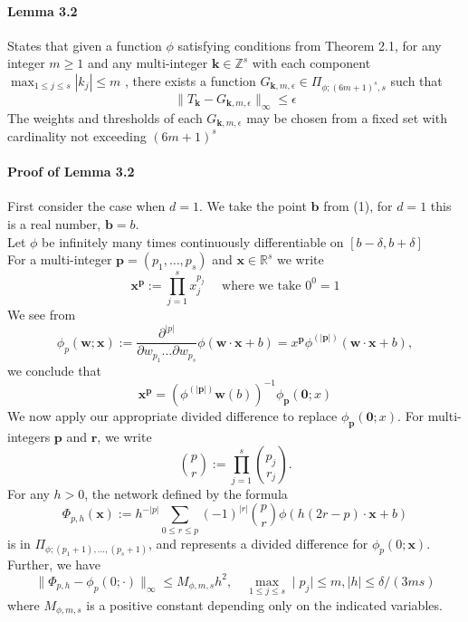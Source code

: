 \documentclass{article}
\begin{document}
\paragraph[short]{Lemma 3.2}

States that given a function \(\phi\) satisfying conditions from Theorem 2.1, for any integer \(m \geq 1\) and any multi-integer \(\mathbf{k} \in \mathbb{Z}^{s} \) with each component \(\mathop{\max}_{1 \leq j \leq s} |k_{j}| \leq m\) , there exists a function \(G_{\mathbf{k} ,m ,\epsilon} \in \Pi_{\phi ; (6m +1)^s, s}\) such that 
\[
    \|T_{\mathbf{k}} - G_{\mathbf{k} ,m ,\epsilon}\|_{\infty} \leq \epsilon
\]
The weights and thresholds of each \(G_{\mathbf{k} ,m,\epsilon }\) may be chosen from a fixed set with cardinality not exceeding \((6m  +1)^s\) 

\paragraph[short]{Proof of Lemma 3.2}

First consider the case when \(d = 1\). We take the point \(\mathbf{b} \) from (1), for \(d = 1\) this is a real number, \(\mathbf{b} = b \).\\
Let \(\phi \) be infinitely many times continuously differentiable on \([b-\delta ,b+\delta ]\) \\

For a multi-integer \(\mathbf{p} = (p_1, \ldots , p_{s} )\) and \(\mathbf{x} \in \mathbb{R}^s\) we write 
\[
    \mathbf{x}^{\mathbf{p} } := \prod_{j=1}^{s} x_{j}^{p_{j}} \quad \text{ where we take } 0^0 = 1
\]
We see from
\[
    \phi_{p}(\mathbf{w}; \mathbf{x}) := \frac{\partial^{|p|}}{\partial w_{p_1} \dots \partial w_{p_s}} \phi(\mathbf{w} \cdot \mathbf{x} + b) = x^{\mathbf{p} } \phi^{(|\mathbf{p}|)}(\mathbf{w} \cdot \mathbf{x} + b),
\]
we conclude that
\[
    \mathbf{x}^{\mathbf{p} } = \left(
        \phi^{(|\mathbf{p}|)}\mathbf{w} (b)
     \right)^{-1} \phi_{\mathbf{p} }(\textbf{0} ; x)
\]
We now apply our appropriate divided difference to replace \(\phi_{\mathbf{p} }(\textbf{0} ; x)\).
For multi-integers \(\mathbf{p}\) and \(\mathbf{r} \), we write
\[
\binom{p}{r} := \prod_{j=1}^{s} \binom{p_j}{r_j}.
\]
For any \( h > 0 \), the network defined by the formula
\[    
    \Phi_{p,h}(\mathbf{x}) := h^{-|p|} \sum_{0 \leq r \leq p} (-1)^{|r|} \binom{p}{r} \phi(h(2r - p) \cdot \mathbf{x} + b)
\]
is in \( \Pi_{\phi;(p_1+1), \ldots, (p_s+1)} \), and represents a divided difference for \( \phi_{p}(0; \mathbf{x}) \). Further, we have
\[
\| \Phi_{p,h} - \phi_{p}(0; \cdot) \|_{\infty} \leq M_{\phi,m,s}h^2, \quad \mathop{\max}_{1 \leq j \leq s} \mid p_{j} \mid \leq m, \mid h \mid \leq \delta / (3ms)
\]
where \( M_{\phi,m,s} \) is a positive constant depending only on the indicated variables.
\end{document}
